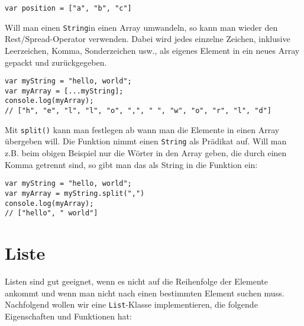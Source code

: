 \documentclass{book}
\begin{document}
\begin{lstlisting}[caption=Array Konstruktor]
var position = ["a", "b", "c"]
\end{lstlisting}

Will man einen \lstinline|String|in einen Array umwandeln, so kann man wieder den Rest/Spread-Operator verwenden. Dabei wird jedes einzelne Zeichen, inklusive Leerzeichen, Komma, Sonderzeichen usw., als eigenes Element in ein neues Array gepackt und zurückgegeben.

\begin{lstlisting}[caption=Array Konstruktor]
var myString = "hello, world";
var myArray = [...myString];
console.log(myArray);
// ["h", "e", "l", "l", "o", ",", " ", "w", "o", "r", "l", "d"]
\end{lstlisting}

Mit \lstinline|split()| kann man festlegen ab wann man die Elemente in einen Array übergeben will. Die Funktion nimmt einen \lstinline|String| als Prädikat auf. Will man z.B. beim obigen Beispiel nur die Wörter in den Array geben, die durch einen Komma getrennt sind, so gibt man das als String in die Funktion ein:
\begin{lstlisting}[caption=Array Konstruktor]
var myString = "hello, world";
var myArray = myString.split(",")
console.log(myArray);
// ["hello", " world"]
\end{lstlisting}

\section{Liste}
Listen sind gut geeignet, wenn es nicht auf die Reihenfolge der Elemente ankommt und wenn man nicht nach einen bestimmten Element suchen muss. Nachfolgend wollen wir eine \lstinline|List|-Klasse implementieren, die folgende Eigenschaften und Funktionen hat:
\end{document}
